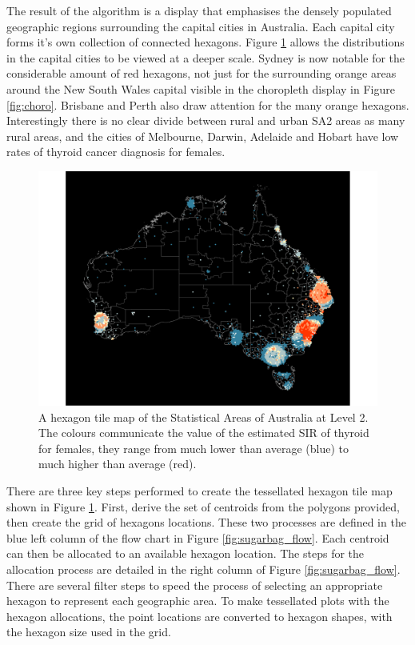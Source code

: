 The result of the algorithm is a display that emphasises the densely
populated geographic regions surrounding the capital cities in
Australia. Each capital city forms it's own collection of connected
hexagons. Figure \ref{fig:hexmap} allows the distributions in the
capital cities to be viewed at a deeper scale. Sydney is now notable for
the considerable amount of red hexagons, not just for the surrounding
orange areas around the New South Wales capital visible in the
choropleth display in Figure \ref{fig:choro}. Brisbane and Perth also
draw attention for the many orange hexagons. Interestingly there is no
clear divide between rural and urban SA2 areas as many rural areas, and
the cities of Melbourne, Darwin, Adelaide and Hobart have low rates of
thyroid cancer diagnosis for females.

\begin{Schunk}
\begin{figure}
\includegraphics[width=0.95\linewidth]{kobakian-cook_files/figure-latex/hexmap-1} \caption[A hexagon tile map of the Statistical Areas of Australia at Level 2]{A hexagon tile map of the Statistical Areas of Australia at Level 2. The colours communicate the value of the estimated SIR of thyroid for females, they range from much lower than average (blue) to much higher than average (red).}\label{fig:hexmap}
\end{figure}
\end{Schunk}

There are three key steps performed to create the tessellated hexagon
tile map shown in Figure \ref{fig:hexmap}. First, derive the set of
centroids from the polygons provided, then create the grid of hexagons
locations. These two processes are defined in the blue left column of
the flow chart in Figure \ref{fig:sugarbag_flow}. Each centroid can then
be allocated to an available hexagon location. The steps for the
allocation process are detailed in the right column of Figure
\ref{fig:sugarbag_flow}. There are several filter steps to speed the
process of selecting an appropriate hexagon to represent each geographic
area. To make tessellated plots with the hexagon allocations, the point
locations are converted to hexagon shapes, with the hexagon size used in
the grid.

